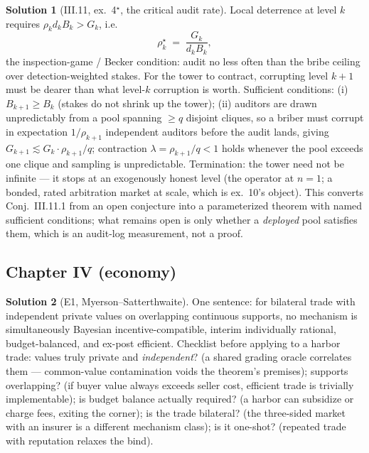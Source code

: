 \documentclass[11pt,a4paper]{article}
\theoremstyle{definition}
\newtheorem{sol}{Solution}
\theoremstyle{remark}
\begin{document}
\begin{sol}[III.11, ex.\ 4$^\star$, the critical audit rate]\label{sol:rho}
Local deterrence at level $k$ requires $\rho_k d_k B_k > G_k$, i.e.
\[ \rho^\star_k \;=\; \frac{G_k}{d_k B_k}, \]
the inspection-game / Becker condition: audit no less often than the bribe ceiling over detection-weighted stakes. For the tower to contract, corrupting level $k{+}1$ must be dearer than what level-$k$ corruption is worth. Sufficient conditions: (i) $B_{k+1} \ge B_k$ (stakes do not shrink up the tower); (ii) auditors are drawn unpredictably from a pool spanning $\ge q$ disjoint cliques, so a briber must corrupt in expectation $1/\rho_{k+1}$ independent auditors before the audit lands, giving $G_{k+1} \lesssim G_k \cdot \rho_{k+1}/q$; contraction $\lambda = \rho_{k+1}/q < 1$ holds whenever the pool exceeds one clique and sampling is unpredictable. Termination: the tower need not be infinite --- it stops at an exogenously honest level (the operator at $n{=}1$; a bonded, rated arbitration market at scale, which is ex.\ 10's object). This converts Conj.~III.11.1 from an open conjecture into a parameterized theorem with named sufficient conditions; what remains open is only whether a \emph{deployed} pool satisfies them, which is an audit-log measurement, not a proof.
\end{sol}

\subsection{Chapter IV (economy)}

\begin{sol}[E1, Myerson--Satterthwaite]
One sentence: for bilateral trade with independent private values on overlapping continuous supports, no mechanism is simultaneously Bayesian incentive-compatible, interim individually rational, budget-balanced, and ex-post efficient. Checklist before applying to a harbor trade: values truly private and \emph{independent}? (a shared grading oracle correlates them --- common-value contamination voids the theorem's premises); supports overlapping? (if buyer value always exceeds seller cost, efficient trade is trivially implementable); is budget balance actually required? (a harbor can subsidize or charge fees, exiting the corner); is the trade bilateral? (the three-sided market with an insurer is a different mechanism class); is it one-shot? (repeated trade with reputation relaxes the bind).
\end{sol}
\end{document}
